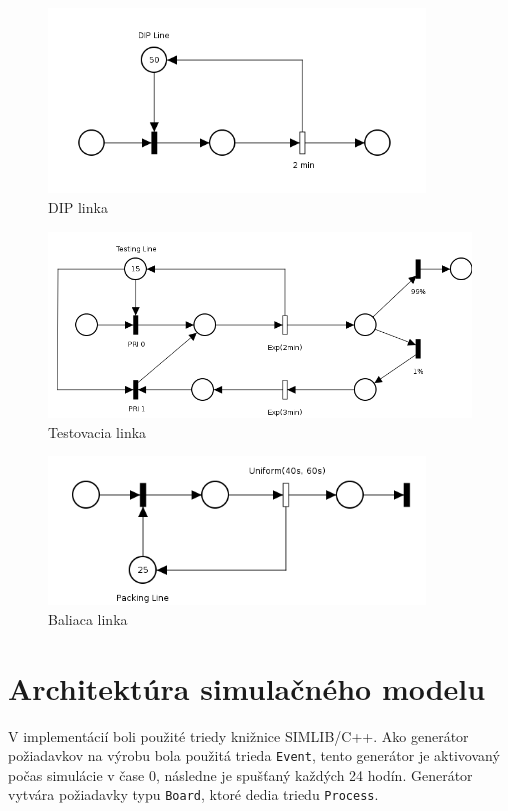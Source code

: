\documentclass[12pt,a4paper,titlepage,final]{article}
\begin{document}
\begin{figure}[!h]
  \centering
  \includegraphics[width=10cm]{dip.png}
  \caption{DIP linka}
\end{figure}

\begin{figure}[!h]
  \centering
  \includegraphics[width=14cm]{tst.png}
  \caption{Testovacia linka}
\end{figure}

\begin{figure}[!h]
  \centering
  \includegraphics[width=10cm]{pkg.png}
  \caption{Baliaca linka}
\end{figure}

\section{Architektúra simulačného modelu}
V implementácií boli použité triedy knižnice SIMLIB/C++. Ako generátor požiadavkov
na výrobu bola použitá trieda \texttt{Event}, tento generátor je aktivovaný počas simulácie
v čase 0, následne je spušťaný každých 24 hodín. Generátor vytvára požiadavky typu
\texttt{Board}, ktoré dedia triedu \texttt{Process}.
\end{document}
